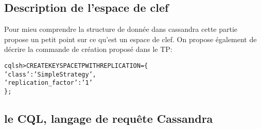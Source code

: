 \subsection{Description de l'espace de clef}
\par Pour mieu comprendre la structure de donnée dans cassandra
cette partie propose un petit point sur ce qu'est un espace de clef.
On propose également de décrire la commande de création proposé dans le TP: \newline
\begin{tt}
\begin{alltt}
cqlsh> CREATE KEYSPACE TP WITH REPLICATION = \{
		'class' : 'SimpleStrategy',
		'replication\_factor' : '1'
\};
\end{alltt}
\end{tt}
\subsection{le CQL, langage de requête Cassandra}
